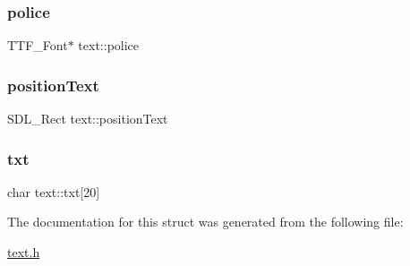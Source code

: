 \mbox{\label{structtext_aec9ba02a1c093b1db8aa0f16ac092459}} 
\subsubsection{\texorpdfstring{police}{police}}
{\footnotesize\ttfamily T\+T\+F\+\_\+\+Font$\ast$ text\+::police}

\mbox{\label{structtext_a01cc24369eccbe9ccb68af9a748315d3}} 
\subsubsection{\texorpdfstring{position\+Text}{positionText}}
{\footnotesize\ttfamily S\+D\+L\+\_\+\+Rect text\+::position\+Text}

\mbox{\label{structtext_afd7610607c0ade6ed450f86e275ddce5}} 
\subsubsection{\texorpdfstring{txt}{txt}}
{\footnotesize\ttfamily char text\+::txt\mbox{[}20\mbox{]}}



The documentation for this struct was generated from the following file\+:\begin{DoxyCompactItemize}
\item 
\hyperlink{text_8h}{text.\+h}\end{DoxyCompactItemize}
